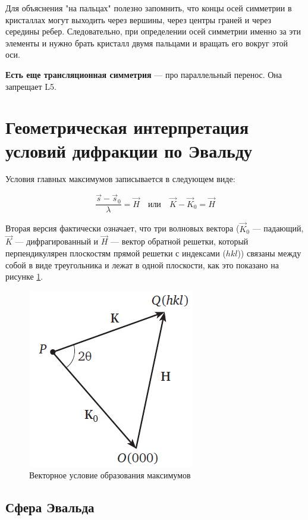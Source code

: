 \documentclass[a4paper, 12pt]{article}
\begin{document}
Для объяснения "на пальцах" полезно запомнить, что концы осей симметрии в кристаллах могут выходить через вершины, через центры граней и через середины ребер. Следовательно, при определении осей симметрии именно за эти элементы и нужно брать кристалл двумя пальцами и вращать его вокруг этой оси.

\textbf{Есть еще трансляционная симметрия} --- про параллельный перенос. Она запрещает L5.

\section{Геометрическая интерпретация условий дифракции по Эвальду}

Условия главных максимумов записывается в следующем виде:

\begin{equation}
	\frac{\vec{s} - \vec{s}_0}{\lambda} = \vec{H} \quad \text{или} \quad \vec{K} - \vec{K}_0 = \vec{H}
\end{equation}

Вторая версия фактически означает, что три волновых вектора ($\vec{K}_0$ --- падающий, $\vec{K}$ --- дифрагированный и $\vec{H}$ --- вектор обратной решетки, который перпендикулярен плоскостям прямой решетки с индексами ($hkl$)) связаны между собой в виде треугольника и лежат в одной плоскости, как это показано на рисунке \ref{fig:difraction}.

\begin{figure}[H]
	\centering
	\includegraphics[width=0.5\linewidth]{Difraction}
	\caption{Векторное условие образования максимумов}
	\label{fig:difraction}
\end{figure}

\subsection{Сфера Эвальда}
\end{document}
